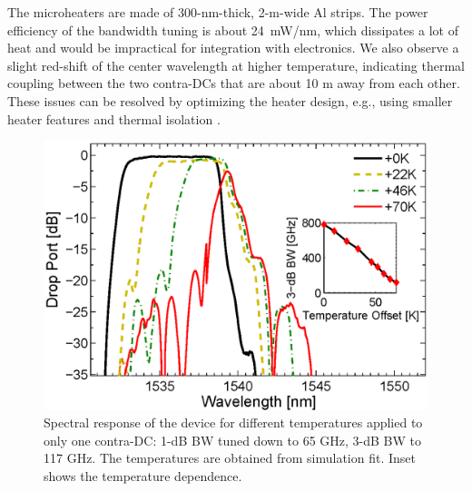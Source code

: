 \documentclass[9pt,twocolumn,twoside]{osajnl}
\begin{document}
	The microheaters are made of 300-nm-thick, 2-\textmu m-wide Al strips.
	The power efficiency of the bandwidth tuning is about 24~mW/nm, which dissipates a lot of heat and would be impractical for integration with electronics.
	We also observe a slight red-shift of the center wavelength at higher temperature, indicating thermal coupling between the two contra-DCs that are about 10 \textmu m away from each other.
	These issues can be resolved by optimizing the heater design, e.g., using smaller heater features and thermal isolation \cite{dong2010thermally}.
	
	
	
	\begin{figure}[htbp]
		\centering
		\includegraphics[width=.99\columnwidth]{data/Band6}
		\caption{Spectral response of the device for different temperatures applied to only one contra-DC: 1-dB BW tuned down to 65 GHz, 3-dB BW to 117 GHz. The temperatures are obtained from simulation fit. Inset shows the temperature dependence.}
		\label{fig:bandTune}
	\end{figure} 
	
\end{document}
